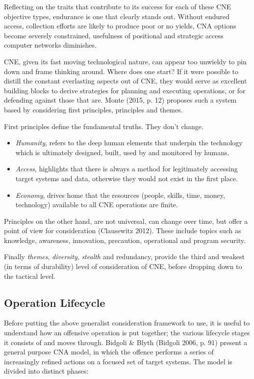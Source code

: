 \documentclass[11pt]{report}
\begin{document}
Reflecting on the traits that contribute to its success for each of these CNE objective types, endurance is one that clearly stands out. Without endured access, collection efforts are likely to produce poor or no yields, CNA options become severely constrained, usefulness of positional and strategic access computer networks diminishes.

CNE, given its fast moving technological nature, can appear too unwieldy to pin down and frame thinking around. Where does one start? If it were possible to distill the constant everlasting aspects out of CNE, they would serve as excellent building blocks to derive strategies for planning and executing operations, or for defending against those that are. Monte (2015, p. 12) proposes such a system based by considering first principles, principles and themes.

First principles define the fundamental truths. They don’t change.

\begin{itemize}
	\item \textit{Humanity}, refers to the deep human elements that underpin the technology which is ultimately designed, built, used by and monitored by humans.
	\item \textit{Access}, highlights that there is always a method for legitimately accessing target systems and data, otherwise they would not exist in the first place.
	\item \textit{Economy}, drives home that the resources (people, skills, time, money, technology) available to all CNE operations are finite.
\end{itemize}

Principles on the other hand, are not universal, can change over time, but offer a point of view for consideration (Clausewitz 2012). These include topics such as knowledge, awareness, innovation, precaution, operational and program security.

Finally \textit{themes}, \textit{diversity}, \textit{stealth} and redundancy, provide the third and weakest (in terms of durability) level of consideration of CNE, before dropping down to the tactical level.




\subsection{Operation Lifecycle}

Before putting the above generalist consideration framework to use, it is useful to understand how an offensive operation is put together; the various lifecycle stages it consists of and moves through. Bidgoli \& Blyth (Bidgoli 2006, p. 91) present a general purpose CNA model, in which the offence performs  a series of increasingly refined actions on a focused set of  target systems. The model is divided into distinct phases:
\end{document}
